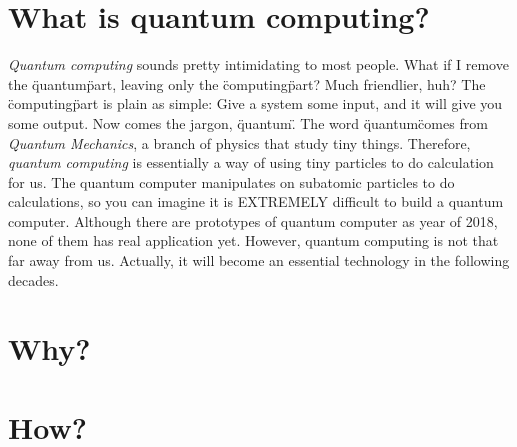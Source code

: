 \section{\textbf{What} is quantum computing?}

\begin{fullwidth}

    \textit{Quantum computing} sounds pretty intimidating to most people. What if I remove the \"quantum\" part, leaving only the \"computing\" part? 
    Much friendlier, huh? 
    The \"computing\" part is plain as simple: Give a system some input, and it will give you some output. 
    Now comes the jargon, \"quantum\". The word \"quantum\" comes from \textit{Quantum Mechanics}, a branch of physics that study tiny things. 
    Therefore, \textit{quantum computing} is essentially a way of using tiny particles to do calculation for us.
    The quantum computer manipulates on subatomic particles to do calculations, so you can imagine it is EXTREMELY difficult to build a quantum computer.
    Although there are prototypes of quantum computer as year of 2018, none of them has real application yet.
    However, quantum computing is not that far away from us.
    Actually, it will become an essential technology in the following decades.

\end{fullwidth}

\section{Why?}
\section{How?}